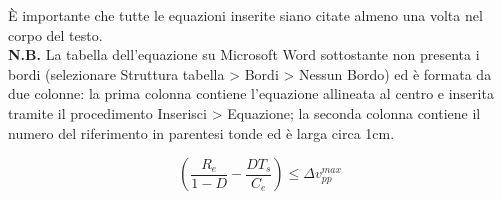 È importante che tutte le equazioni inserite siano citate almeno una volta nel corpo del testo. \\

\textbf{N.B.} La tabella dell'equazione su Microsoft Word sottostante non presenta i bordi (selezionare Struttura tabella > Bordi > Nessun Bordo) ed è formata da due colonne: la prima colonna contiene l’equazione allineata al centro e inserita tramite il procedimento Inserisci > Equazione; la seconda colonna contiene il numero del riferimento in parentesi tonde ed è larga circa 1cm.

\begin{equation}
    \left(\frac{R_e}{1-D}-\frac{DT_s}{C_e}\right) \le \Delta v_{pp}^{max}
\end{equation}